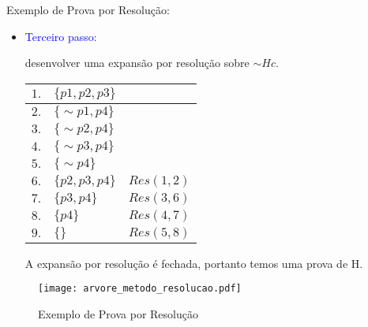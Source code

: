 \begin{frame}{Exemplo de Prova por Resolução:}
\begin{itemize}
\item  \textcolor{blue}{Terceiro passo:} 

desenvolver uma expansão por resolução sobre $\sim Hc$.
\begin{table}
\centering
\begin{tabular}{r|l|r}
\hline
\hline
$1.$&$\{p1,p2,p3\}$&$ $\\
\hline
$2.$&$\{\sim p1,p4\}$&$ $\\
\hline
$3.$&$\{\sim p2,p4\}$&$ $\\
\hline
$4.$&$\{\sim p3,p4\}$&$ $\\
\hline
$5.$&$\{\sim p4\}$&$ $\\
\hline
$6.$&$\{p2,p3,p4\}$&$Res(1,2)$\\
\hline
$7.$&$\{p3,p4\}$&$Res(3,6)$\\
\hline
$8.$&$\{p4\}$&$Res(4,7)$\\
\hline
$9.$&$\{  \}$&$Res(5,8)$\\
\hline
\hline
\end{tabular}
\end{table}

A expansão por resolução é fechada, portanto temos uma prova de H.

\end{itemize}
\end{frame}

\begin{frame}
\begin{figure}[!htb]
\centering 
\texttt{[image: arvore\_metodo\_resolucao.pdf]}
\caption{Exemplo de Prova por Resolução}
\label{fig_arvore_resolucao}
\end{figure}

\end{frame}

